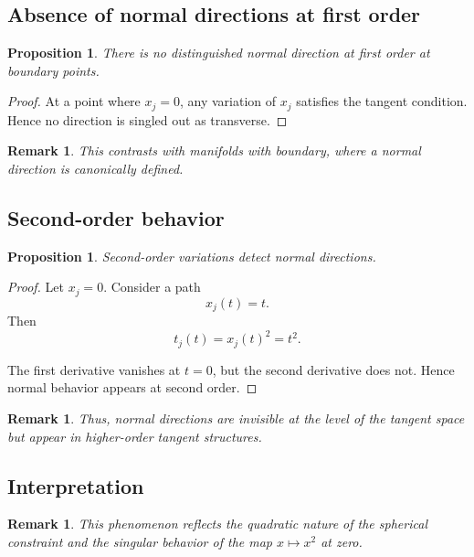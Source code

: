 \documentclass[11pt]{amsart}
\newtheorem{proposition}[theorem]{Proposition}
\newtheorem{remark}[theorem]{Remark}
\begin{document}
\subsection{Absence of normal directions at first order}

\begin{proposition}
There is no distinguished normal direction at first order at boundary points.
\end{proposition}

\begin{proof}
At a point where $x_j=0$, any variation of $x_j$ satisfies the tangent condition. Hence no direction is singled out as transverse.
\end{proof}

\begin{remark}
This contrasts with manifolds with boundary, where a normal direction is canonically defined.
\end{remark}

\subsection{Second-order behavior}

\begin{proposition}
Second-order variations detect normal directions.
\end{proposition}

\begin{proof}
Let $x_j=0$. Consider a path
\[
x_j(t) = t.
\]
Then
\[
t_j(t) = x_j(t)^2 = t^2.
\]

The first derivative vanishes at $t=0$, but the second derivative does not. Hence normal behavior appears at second order.
\end{proof}

\begin{remark}
Thus, normal directions are invisible at the level of the tangent space but appear in higher-order tangent structures.
\end{remark}

\subsection{Interpretation}

\begin{remark}
This phenomenon reflects the quadratic nature of the spherical constraint and the singular behavior of the map $x \mapsto x^2$ at zero.
\end{remark}
\end{document}
